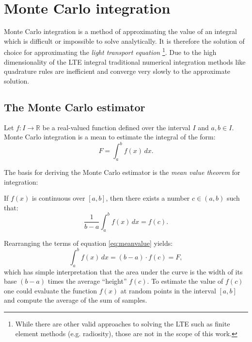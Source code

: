 \chapter{Monte Carlo integration}
\label{ch:montecarlo}
Monte Carlo integration is a method of approximating the value of an integral which is difficult or impossible to solve analytically. It is therefore the solution of choice for approximating the \emph{light transport equation} \footnote{While there are other valid approaches to solving the LTE such as finite element methods (e.g. radiosity), those are not in the scope of this work.}. Due to the high dimensionality of the LTE integral traditional numerical integration methods like quadrature rules are inefficient and converge very slowly to the approximate solution.

\section{The Monte Carlo estimator}
Let $f: I \rightarrow \mathbb{R}$ be a real-valued function defined over the interval $I$ and $a,b \in I$. Monte Carlo integration is a mean to estimate the integral of the form:
\begin{equation}
  F = \int_{a}^{b} f(x)\,dx.
\end{equation}

The basis for deriving the Monte Carlo estimator is the \emph{mean value theorem} for integration:
\begin{thm}
If $f(x)$ is continuous over $[a, b]$, then there exists a number $c \in (a, b)$ such that:
\begin{equation}
\label{eq:meanvalue}
  \frac{1}{b-a} \int_{a}^{b} f(x)\,dx = f(c).
\end{equation}
\end{thm}
Rearranging the terms of equation \ref{eq:meanvalue} yields:
\begin{equation}
  \int_{a}^{b} f(x)\,dx = (b-a) \cdot f(c) = F,
\end{equation}
which has simple interpretation that the area under the curve is the width of its base $(b-a)$ times the average ``height'' $f(c)$. To estimate the value of $f(c)$ one could evaluate the function $f(x)$ at random points in the interval $[a,b]$ and compute the average of the sum of samples.

